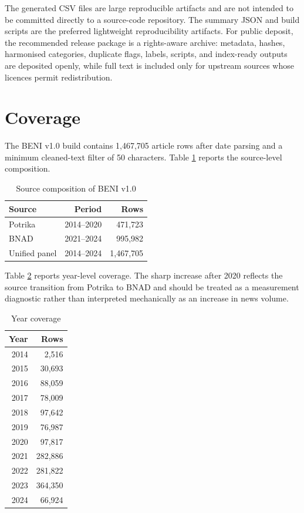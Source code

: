 \documentclass[11pt]{article}
\begin{document}
The generated CSV files are large reproducible artifacts and are not intended to be committed directly to a source-code repository. The summary JSON and build scripts are the preferred lightweight reproducibility artifacts. For public deposit, the recommended release package is a rights-aware archive: metadata, hashes, harmonised categories, duplicate flags, labels, scripts, and index-ready outputs are deposited openly, while full text is included only for upstream sources whose licences permit redistribution.

\section{Coverage}

The BENI v1.0 build contains 1,467,705 article rows after date parsing and a minimum cleaned-text filter of 50 characters. Table \ref{tab:source-counts} reports the source-level composition.

\begin{table}[htbp]
\centering
\caption{Source composition of BENI v1.0}
\label{tab:source-counts}
\begin{tabular}{lrr}
\toprule
Source & Period & Rows\\
\midrule
Potrika & 2014--2020 & 471,723\\
BNAD & 2021--2024 & 995,982\\
\midrule
Unified panel & 2014--2024 & 1,467,705\\
\bottomrule
\end{tabular}
\end{table}

Table \ref{tab:year-coverage} reports year-level coverage. The sharp increase after 2020 reflects the source transition from Potrika to BNAD and should be treated as a measurement diagnostic rather than interpreted mechanically as an increase in news volume.

\begin{table}[htbp]
\centering
\caption{Year coverage}
\label{tab:year-coverage}
\begin{tabular}{rr}
\toprule
Year & Rows\\
\midrule
2014 & 2,516\\
2015 & 30,693\\
2016 & 88,059\\
2017 & 78,009\\
2018 & 97,642\\
2019 & 76,987\\
2020 & 97,817\\
2021 & 282,886\\
2022 & 281,822\\
2023 & 364,350\\
2024 & 66,924\\
\bottomrule
\end{tabular}
\end{table}
\end{document}
